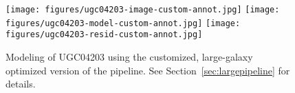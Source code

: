 

\begin{figure}
\centering
\texttt{[image: figures/ugc04203-image-custom-annot.jpg]}
\texttt{[image: figures/ugc04203-model-custom-annot.jpg]}
\texttt{[image: figures/ugc04203-resid-custom-annot.jpg]}
\caption{Modeling of UGC04203 using the customized, large-galaxy optimized
  version of the pipeline.  See Section~\ref{sec:largepipeline} for details.
\label{fig:custom}}  
\end{figure}
